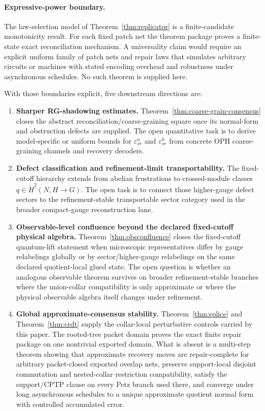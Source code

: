 \documentclass[11pt]{article}
\theoremstyle{remark}
\theoremstyle{plain}
\begin{document}
\paragraph{Expressive-power boundary.}
The law-selection model of Theorem~\ref{thm:replicator} is a finite-candidate monotonicity result.
For each fixed patch net the theorem package proves a finite-state exact reconciliation
mechanism. A universality claim would require an explicit uniform family of patch nets and repair laws that
simulates arbitrary circuits or machines with stated encoding overhead and robustness under
asynchronous schedules. No such theorem is supplied here.

With those boundaries explicit, five downstream directions are:

\begin{enumerate}
\item \textbf{Sharper RG-shadowing estimates.} Theorem~\ref{thm:coarse-grain-consensus} closes the abstract reconciliation/coarse-graining square once its normal-form and obstruction defects are supplied. The open quantitative task is to derive model-specific or uniform bounds for \(\varepsilon^n_{sr}\) and \(\varepsilon^h_{sr}\) from concrete OPH coarse-graining channels and recovery decoders.

\item \textbf{Defect classification and refinement-limit transportability.} The fixed-cutoff hierarchy extends from abelian frustrations to crossed-module classes \(q\in \check H^2(N,H\to G)\). The open task is to connect those higher-gauge defect sectors to the refinement-stable transportable sector category used in the broader compact-gauge reconstruction lane.

\item \textbf{Observable-level confluence beyond the declared fixed-cutoff physical algebra.} Theorem~\ref{thm:obsconfluence} closes the fixed-cutoff quantum-lift statement when microscopic representatives differ by gauge relabelings globally or by sector/higher-gauge relabelings on the same declared quotient-local glued state. The open question is whether an analogous observable theorem survives on broader refinement-stable branches where the union-collar compatibility is only approximate or where the physical observable algebra itself changes under refinement.

\item \textbf{Global approximate-consensus stability.} Theorem~\ref{thm:splice} and Theorem~\ref{thm:crdt} supply the collar-local perturbative controls carried by this paper. The rooted-tree packet domain proves the exact finite repair package on one nontrivial exported domain. What is absent is a multi-step theorem showing that approximate recovery moves are repair-complete for arbitrary packet-closed exported overlap nets, preserve support-local disjoint commutation and nested-collar restriction compatibility, satisfy the support/CPTP clause on every Petz branch used there, and converge under long asynchronous schedules to a unique approximate quotient normal form with controlled accumulated error.


\end{enumerate}
\end{document}
